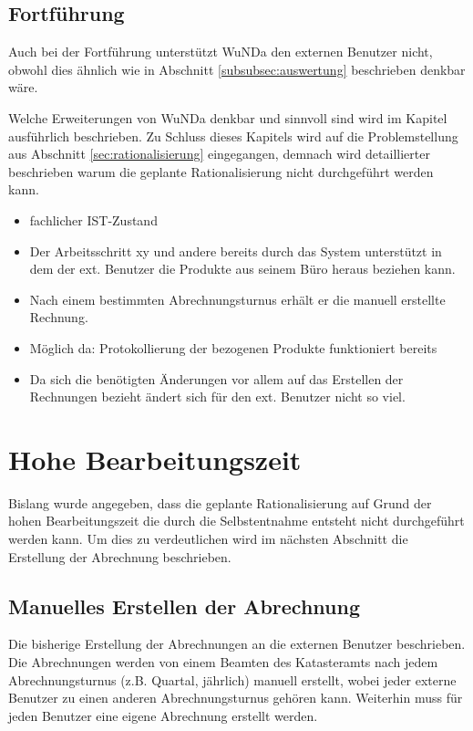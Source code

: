 \subsection{Fortführung}
Auch bei der Fortführung unterstützt \ac{WuNDa} den externen Benutzer nicht, obwohl dies ähnlich wie in Abschnitt \ref{subsubsec:auswertung} beschrieben denkbar wäre.

Welche Erweiterungen von \ac{WuNDa} denkbar und sinnvoll sind wird im Kapitel  ausführlich beschrieben. Zu Schluss dieses Kapitels wird auf die Problemstellung aus Abschnitt \ref{sec:rationalisierung} eingegangen, demnach wird detaillierter beschrieben warum die geplante Rationalisierung nicht durchgeführt werden kann.

\begin{itemize}
	\item fachlicher IST-Zustand
	\item Der Arbeitsschritt xy und andere bereits durch das System unterstützt in dem der ext. Benutzer die Produkte aus seinem Büro heraus beziehen kann.
	\item Nach einem bestimmten Abrechnungsturnus erhält er die manuell erstellte Rechnung.
	\item Möglich da: Protokollierung der bezogenen Produkte funktioniert bereits
	\item Da sich die benötigten Änderungen vor allem auf das Erstellen der Rechnungen bezieht ändert sich für den ext. Benutzer nicht so viel.
\end{itemize}

\section{Hohe Bearbeitungszeit}

Bislang wurde angegeben, dass die geplante Rationalisierung auf Grund der hohen Bearbeitungszeit die durch die Selbstentnahme entsteht nicht durchgeführt werden kann. Um dies zu verdeutlichen wird im nächsten Abschnitt die Erstellung der Abrechnung beschrieben. 

\subsection{Manuelles Erstellen der Abrechnung} \label{subsec:erstellen_abrechnung}
Die bisherige Erstellung der Abrechnungen an die externen Benutzer beschrieben. Die Abrechnungen werden von einem Beamten des Katasteramts nach jedem Abrechnungsturnus (z.B. Quartal, jährlich) manuell erstellt, wobei jeder externe Benutzer zu einen anderen Abrechnungsturnus gehören kann.
Weiterhin muss für jeden Benutzer eine eigene Abrechnung erstellt werden.

